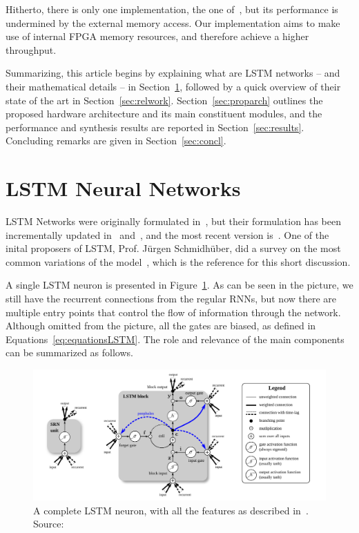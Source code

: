 \documentclass{IEEEtran}
\begin{document}
Hitherto, there is only one implementation, the one of~\cite{Chang15}, but its performance is undermined
by the external memory access. Our implementation aims to make use of internal FPGA memory resources,
and therefore achieve a higher throughput.

Summarizing, this article begins by explaining what are LSTM networks -- and their mathematical
details -- in Section~\ref{sec:lstmnn}, followed by a quick overview of their state
of the art in Section~\ref{sec:relwork}. Section~\ref{sec:proparch} outlines the proposed
hardware architecture and its main constituent modules, and the performance and synthesis
results are reported in Section~\ref{sec:results}. Concluding remarks are given in
Section~\ref{sec:concl}.

\section{LSTM Neural Networks}\label{sec:lstmnn}
LSTM Networks were originally formulated in~\cite{Hoch97}, but their formulation has been incrementally
updated in~\cite{Gers00} and~\cite{Gers2000}, and the most recent version is~\cite{Graves05}.
One of the inital proposers of LSTM, Prof. Jürgen Schmidhüber, did a survey on the most common variations
of the model~\cite{Greff15}, which is the reference for this short discussion.

A single LSTM neuron is presented in Figure~\ref{fig:lstmneuron}. As can be seen in the picture,
we still have the recurrent connections from the regular RNNs, but now there are multiple entry points
that control the flow of information through the network. Although omitted from the picture, all the
gates are biased, as defined in Equations~\ref{eq:equationsLSTM}. The role and relevance of the main components can
be summarized as follows.

\begin{figure}[!t]
	\centering
	\includegraphics[width=1.1\linewidth]{figures/lstmneuron.png}
    \caption{A complete LSTM neuron, with all the features as described in~\cite{Graves05}. Source:~\cite{Greff15}}
	\label{fig:lstmneuron}
\end{figure}
\end{document}
